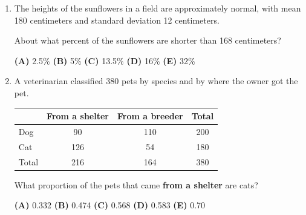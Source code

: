 \documentclass[12pt]{article}
\begin{document}
\begin{enumerate}[leftmargin=1.9em, itemsep=0.13in]
  \boxguard[8]
  \item The heights of the sunflowers in a field are approximately normal, with mean 180
        centimeters and standard deviation 12 centimeters.

        About what percent of the sunflowers are shorter than 168 centimeters?\hfill{}\rule[-0.2in]{0pt}{0.48in}
        \par\vspace{3pt}\noindent
        \hspace{1.2em}\textbf{(A)} 2.5\% \hfill \textbf{(B)} 5\% \hfill
        \textbf{(C)} 13.5\% \hfill \textbf{(D)} 16\% \hfill \textbf{(E)} 32\%

  \boxguard[13]
  \item A veterinarian classified 380 pets by species and by where the owner got the pet.

        \vspace{2pt}
        {\centering\small
        \renewcommand{\arraystretch}{1.15}
        \begin{tabular}{@{} l c c c @{}}
        \rowcolor{sky}
         & \textbf{From a shelter} & \textbf{From a breeder} & \textbf{Total} \\
        \midrule
        Dog   & 90  & 110 & 200 \\
        Cat   & 126 & 54  & 180 \\
        \midrule
        Total & 216 & 164 & 380 \\
        \end{tabular}\par}
        \vspace{4pt}

        What proportion of the pets that came \textbf{from a shelter} are cats?\hfill{}\rule[-0.2in]{0pt}{0.48in}
        \par\vspace{3pt}\noindent
        \hspace{1.2em}\textbf{(A)} 0.332 \hfill \textbf{(B)} 0.474 \hfill
        \textbf{(C)} 0.568 \hfill \textbf{(D)} 0.583 \hfill \textbf{(E)} 0.70


\end{enumerate}
\end{document}
